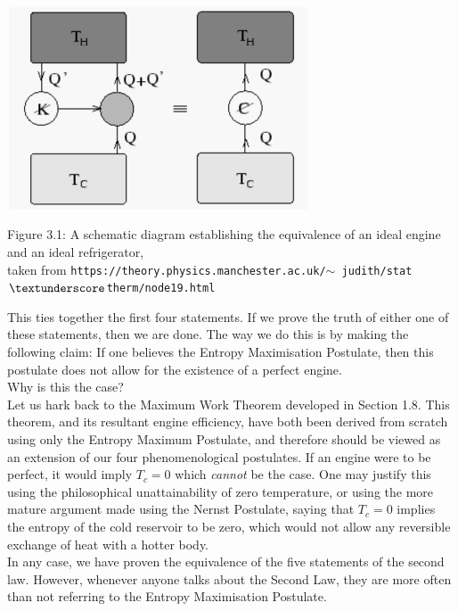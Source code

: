 \documentclass[oneside]{book}
\begin{document}
\begin{center}
\includegraphics[height = 6cm, width = 9cm]{Buz}
\end{center}
\begin{center}
Figure 3.1: A schematic diagram establishing the equivalence of an ideal engine and an ideal refrigerator,\\
taken from \texttt{https://theory.physics.manchester.ac.uk/$\sim$ judith/stat$\textunderscore$therm/node19.html} 
\end{center}

This ties together the first four statements. If we prove the truth of either one of these statements, then we are done. The way we do this is by making the following claim: If one believes the Entropy Maximisation Postulate, then this postulate does not allow for the existence of a perfect engine.\\

Why is this the case?\\

Let us hark back to the Maximum Work Theorem developed in Section 1.8. This theorem, and its resultant engine efficiency, have both been derived from scratch using only the Entropy Maximum Postulate, and therefore should be viewed as an extension of our four phenomenological postulates. If an engine were to be perfect, it would imply $T_{c} = 0$ which \emph{cannot} be the case. One may justify this using the philosophical unattainability of zero temperature, or using the more mature argument made using the Nernst Postulate, saying that $T_c = 0$ implies the entropy of the cold reservoir to be zero, which would not allow any reversible exchange of heat with a hotter body.\\

In any case, we have proven the equivalence of the five statements of the second law. However, whenever anyone talks about the Second Law, they are more often than not referring to the Entropy Maximisation Postulate.\\
\end{document}
